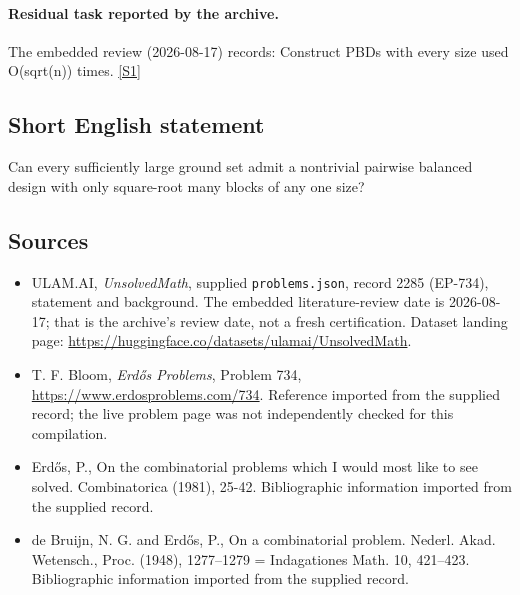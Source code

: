\documentclass[11pt,a4paper]{article}
\newcommand{\sref}[2]{\hyperlink{source:#1:#2}{[S#2]}}
\begin{document}
\paragraph{Residual task reported by the archive.}

The embedded review (2026-08-17) records: Construct PBDs with every size used O(sqrt(n)) times. \sref{2285}{1}

\subsection{Short English statement}

Can every sufficiently large ground set admit a nontrivial pairwise balanced design with only square-root many blocks of any one size?

\subsection{Sources}

{\small

\begin{itemize}

\item[\hypertarget{source:2285:1}{S1}] ULAM.AI, \emph{UnsolvedMath}, supplied \texttt{problems.json}, record 2285 (EP-734), statement and background. The embedded literature-review date is 2026-08-17; that is the archive’s review date, not a fresh certification. Dataset landing page: \url{https://huggingface.co/datasets/ulamai/UnsolvedMath}.

\item[\hypertarget{source:2285:2}{S2}] T. F. Bloom, \emph{Erdős Problems}, Problem 734, \url{https://www.erdosproblems.com/734}. Reference imported from the supplied record; the live problem page was not independently checked for this compilation.

\item[\hypertarget{source:2285:3}{S3}] Erd\H{o}s, P., On the combinatorial problems which I would most like to see solved. Combinatorica (1981), 25-42. Bibliographic information imported from the supplied record.

\item[\hypertarget{source:2285:4}{S4}] de Bruijn, N. G. and Erd\H{o}s, P., On a combinatorial problem. Nederl. Akad. Wetensch., Proc. (1948), 1277--1279 = Indagationes Math. 10, 421--423. Bibliographic information imported from the supplied record.

\end{itemize}

}

\label{end:2285}
\end{document}
